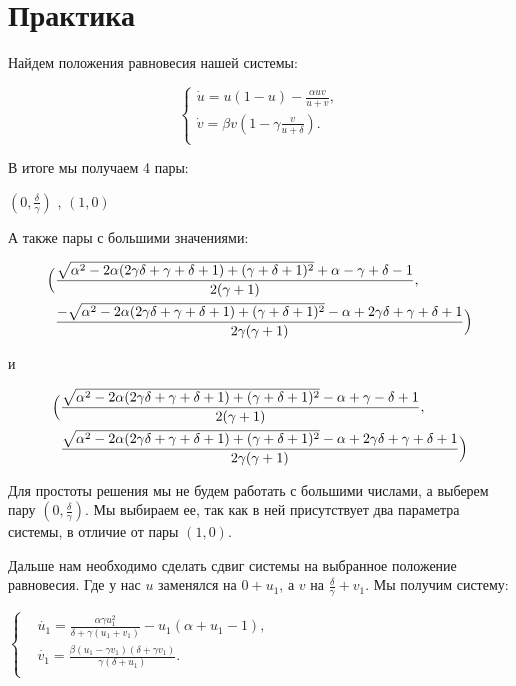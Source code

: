 \chapter{Практика}
Найдем положения равновесия нашей системы:

$$ \left\{
\begin{aligned}
   \dot{u} = u \left(1 - u\right) - \frac{\alpha  u  v}{u+v},\\
   \dot{v} = \beta  v \left(1 - \gamma  \frac{v}{u + \delta}\right).\\
\end{aligned}
\right. $$

В итоге мы получаем 4 пары:

$\left ( 0, \frac{\delta }{\gamma} \right )$ ,
$\left ( 1, 0 \right )$ 

А также пары с большими значениями:

\[ \begin{aligned}
\Bigl ( &\frac{\sqrt{\alpha ^2-2 \alpha  (2 \gamma \delta +\gamma +\delta +1)+(\gamma +\delta +1)^2}+\alpha -\gamma  +\delta  -1}{2 (\gamma  +1)},\\
&\frac{-\sqrt{\alpha ^2-2 \alpha  (2  \gamma  \delta +\gamma +\delta +1)+(\gamma +\delta +1)^2}-\alpha +2 \gamma  \delta +\gamma +\delta +1}{2 \gamma  (\gamma +1)} \Bigr ) 
\end{aligned} \]

и

\[ \begin{aligned}
\Bigl ( &\frac{\sqrt{\alpha ^2-2 \alpha  (2 \gamma  \delta +\gamma +\delta +1)+(\gamma +\delta +1)^2}-\alpha +\gamma -\delta +1}{2 (\gamma +1)},\\ &\frac{\sqrt{\alpha ^2-2 \alpha  (2 \gamma  \delta +\gamma +\delta +1)+(\gamma +\delta +1)^2}-\alpha +2 \gamma \delta +\gamma +\delta +1}{2 \gamma  (\gamma +1)} \Bigr ) 
\end{aligned} \]

Для простоты решения мы не будем работать с большими числами, а выберем пару $\left ( 0, \frac{\delta }{\gamma} \right )$. Мы выбираем ее, так как в ней присутствует два параметра системы, в отличие от пары $\left ( 1, 0 \right )$. 

Дальше нам необходимо сделать сдвиг системы на выбранное положение равновесия. Где у нас $u$ заменялся на $0 + u_1$, а $v$ на $\frac{\delta }{\gamma} + v_1$. Мы получим систему:

$ \left\{
\begin{aligned}
	&\dot{u_1} = \frac{\alpha  \gamma  u_1^2}{\delta +\gamma  (u_1+v_1)}-u_1 (\alpha +u_1-1),\\
	&\dot{v_1} = \frac{\beta  (u_1-\gamma  v_1) (\delta +\gamma  v_1)}{\gamma (\delta +u_1)}.\\
\end{aligned}
\right. $

